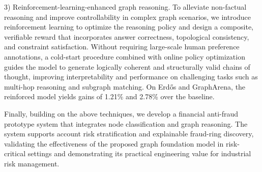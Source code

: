 \begin{eabstract}
3) Reinforcement-learning-enhanced graph reasoning.
To alleviate non-factual reasoning and improve controllability in complex graph scenarios, we introduce reinforcement learning to optimize the reasoning policy and design a composite, verifiable reward that incorporates answer correctness, topological consistency, and constraint satisfaction. Without requiring large-scale human preference annotations, a cold-start procedure combined with online policy optimization guides the model to generate logically coherent and structurally valid chains of thought, improving interpretability and performance on challenging tasks such as multi-hop reasoning and subgraph matching. On Erd\H{o}s and GraphArena, the reinforced model yields gains of 1.21\% and 2.78\% over the baseline.

Finally, building on the above techniques, we develop a financial anti-fraud prototype system that integrates node classification and graph reasoning. The system supports account risk stratification and explainable fraud-ring discovery, validating the effectiveness of the proposed graph foundation model in risk-critical settings and demonstrating its practical engineering value for industrial risk management.
\end{eabstract}

